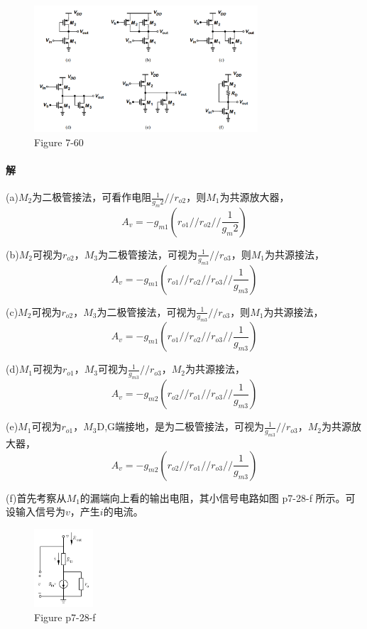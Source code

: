 \documentclass[hyperref, UTF8]{ctexart}
\newcommand{\under}[1]{\frac{1}{#1}}
\begin{document}
    \begin{figure}[!htb]
        \centering
        \includegraphics[width=0.744\textwidth]{p7-60.png}
        \caption*{Figure 7-60}
    \end{figure}
    
\paragraph{解}

    (a)$M_2$为二极管接法，可看作电阻$\frac{1}{g_m2}//r_{o2}$，则$M_1$为共源放大器，
    $$A_v = -g_{m1}(r_{o1}//r_{o2}//\frac{1}{g_m2})$$

    (b)$M_2$可视为$r_{o2}$，$M_3$为二极管接法，可视为$\under{g_{m3}}//r_{o3}$，则$M_1$为共源接法，
    $$A_v = -g_{m1}(r_{o1}//r_{o2}//r_{o3}//\under{g_{m3}})$$

    (c)$M_2$可视为$r_{o2}$，$M_3$为二极管接法，可视为$\under{g_{m3}}//r_{o3}$，则$M_1$为共源接法，
    $$A_v = -g_{m1}(r_{o1}//r_{o2}//r_{o3}//\under{g_{m3}})$$
    
    (d)$M_1$可视为$r_{o1}$，$M_3$可视为$\under{g_{m3}}//r_{o3}$，$M_2$为共源接法，
    $$A_v = -g_{m2}(r_{o2}//r_{o1}//r_{o3}//\under{g_{m3}})$$

    (e)$M_1$可视为$r_{o1}$，$M_3$D,G端接地，是为二极管接法，可视为$\under{g_{m3}}//r_{o3}$，$M_2$为共源放大器，
    $$A_v = -g_{m2}(r_{o2}//r_{o1}//r_{o3}//\under{g_{m3}})$$

    (f)首先考察从$M_1$的漏端向上看的输出电阻，其小信号电路如图 p7-28-f 所示。可设输入信号为$v$，产生$i$的电流。

    \begin{figure}[!htb]
        \centering
        \includegraphics[width=0.195\textwidth]{p7-28-f-sol.png}
        \caption*{Figure p7-28-f}
    \end{figure}
\end{document}

